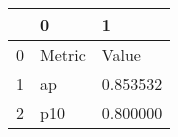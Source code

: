 \begin{tabular}{lll}
\toprule
 & 0 & 1 \\
\midrule
0 & Metric & Value \\
1 & ap & 0.853532 \\
2 & p10 & 0.800000 \\
\bottomrule
\end{tabular}
